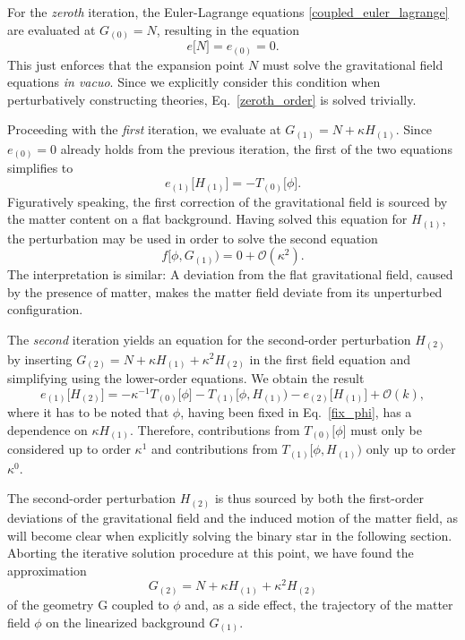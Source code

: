 For the \emph{zeroth} iteration, the Euler-Lagrange equations \eqref{coupled_euler_lagrange} are evaluated at $G_{(0)} = N$, resulting in the equation
\begin{equation}\label{zeroth_order}
  e\lbrack N\rbrack = e_{(0)} = 0.
\end{equation}
This just enforces that the expansion point $N$ must solve the gravitational field equations \emph{in vacuo}. Since we explicitly consider this condition when perturbatively constructing theories, Eq.~\eqref{zeroth_order} is solved trivially.

Proceeding with the \emph{first} iteration, we evaluate at $G_{(1)} = N + \kappa H_{(1)}$. Since $e_{(0)} = 0$ already holds from the previous iteration, the first of the two equations simplifies to
\begin{equation}
  e_{(1)}\lbrack H_{(1)}\rbrack = -T_{(0)} \lbrack\phi\rbrack.
\end{equation}
Figuratively speaking, the first correction of the gravitational field is sourced by the matter content on a flat background. Having solved this equation for $H_{(1)}$, the perturbation may be used in order to solve the second equation
\begin{equation}\label{fix_phi}
  f\lbrack\phi,G_{(1)}) = 0 + \mathcal O(\kappa^2).
\end{equation}
The interpretation is similar: A deviation from the flat gravitational field, caused by the presence of matter, makes the matter field deviate from its unperturbed configuration.

The \emph{second} iteration yields an equation for the second-order perturbation $H_{(2)}$ by inserting $G_{(2)} = N + \kappa H_{(1)} + \kappa^2 H_{(2)}$ in the first field equation and simplifying using the lower-order equations. We obtain the result
\begin{equation}\label{second_order}
  e_{(1)}\lbrack H_{(2)}\rbrack = -\kappa^{-1}T_{(0)}\lbrack\phi\rbrack - T_{(1)}\lbrack\phi,H_{(1)}) - e_{(2)}\lbrack H_{(1)}\rbrack + \mathcal O(k),
\end{equation}
where it has to be noted that $\phi$, having been fixed in Eq.~\eqref{fix_phi}, has a dependence on $\kappa H_{(1)}$. Therefore, contributions from $T_{(0)}\lbrack\phi\rbrack$ must only be considered up to order $\kappa^1$ and contributions from $T_{(1)}\lbrack\phi,H_{(1)})$ only up to order $\kappa^0$.

The second-order perturbation $H_{(2)}$ is thus sourced by both the first-order deviations of the gravitational field and the induced motion of the matter field, as will become clear when explicitly solving the binary star in the following section. Aborting the iterative solution procedure at this point, we have found the approximation
\begin{equation}
  G_{(2)} = N + \kappa H_{(1)} + \kappa^2 H_{(2)}
\end{equation}
of the geometry G coupled to $\phi$ and, as a side effect, the trajectory of the matter field $\phi$ on the linearized background $G_{(1)}$.

